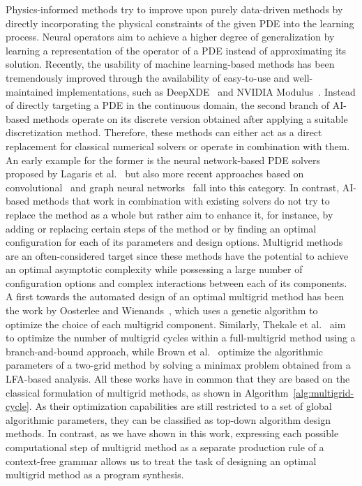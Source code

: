 Physics-informed methods try to improve upon purely data-driven methods by directly incorporating the physical constraints of the given PDE into the learning process.
Neural operators aim to achieve a higher degree of generalization by learning a representation of the operator of a PDE instead of approximating its solution.
Recently, the usability of machine learning-based methods has been tremendously improved through the availability of easy-to-use and well-maintained implementations, such as DeepXDE~\cite{lu2021deepxde} and NVIDIA Modulus~\cite{hennigh2021nvidia}. 
Instead of directly targeting a PDE in the continuous domain, the second branch of AI-based methods operate on its discrete version obtained after applying a suitable discretization method.
Therefore, these methods can either act as a direct replacement for classical numerical solvers or operate in combination with them.
An early example for the former is the neural network-based PDE solvers proposed by Lagaris et al.~\cite{lagaris1998artificial} but also more recent approaches based on convolutional~\cite{thuerey2020deep} and graph neural networks~\cite{pfaff2020learning} fall into this category.
In contrast, AI-based methods that work in combination with existing solvers do not try to replace the method as a whole but rather aim to enhance it, for instance, by adding or replacing certain steps of the method or by finding an optimal configuration for each of its parameters and design options.
Multigrid methods are an often-considered target since these methods have the potential to achieve an optimal asymptotic complexity while possessing a large number of configuration options and complex interactions between each of its components.
A first towards the automated design of an optimal multigrid method has been the work by Oosterlee and Wienands~\cite{oosterlee2003genetic}, which uses a genetic algorithm to optimize the choice of each multigrid component.
Similarly, Thekale et al.~\cite{thekale2010optimizing} aim to optimize the number of multigrid cycles within a full-multigrid method using a branch-and-bound approach, while Brown et al.~\cite{brown2021tuning} optimize the algorithmic parameters of a two-grid method by solving a minimax problem obtained from a LFA-based analysis.
All these works have in common that they are based on the classical formulation of multigrid methods, as shown in Algorithm~\ref{alg:multigrid-cycle}.
As their optimization capabilities are still restricted to a set of global algorithmic parameters, they can be classified as top-down algorithm design methods.
In contrast, as we have shown in this work, expressing each possible computational step of multigrid method as a separate production rule of a context-free grammar allows us to treat the task of designing an optimal multigrid method as a program synthesis.
